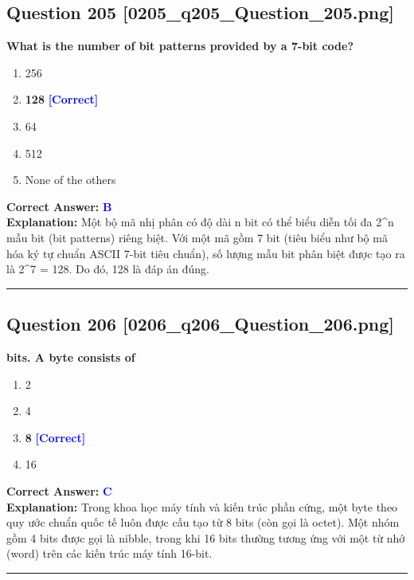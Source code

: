 \documentclass[11pt,a4paper]{article}
\begin{document}
\begin{minipage}{\textwidth}
\subsection*{Question 205 \quad \footnotesize{[0205\_q205\_Question\_205.png]}}
\noindent \textbf{What is the number of bit patterns provided by a 7-bit code?}

\begin{enumerate}[label=\Alph*.]
    \item 256
    \item \textbf{128} \hfill \textcolor{blue}{\textbf{[Correct]}}
    \item 64
    \item 512
    \item None of the others
\end{enumerate}

\noindent \textbf{Correct Answer:} \textcolor{blue}{\textbf{B}} \\[2pt]
\noindent \textbf{Explanation:} Một bộ mã nhị phân có độ dài n bit có thể biểu diễn tối đa 2\textasciicircum{}n mẫu bit (bit patterns) riêng biệt. Với một mã gồm 7 bit (tiêu biểu như bộ mã hóa ký tự chuẩn ASCII 7-bit tiêu chuẩn), số lượng mẫu bit phân biệt được tạo ra là 2\textasciicircum{}7 = 128. Do đó, 128 là đáp án đúng.

\par\vspace{0.3cm}
\hrule
\vspace{0.3cm}
\end{minipage}

\begin{minipage}{\textwidth}
\subsection*{Question 206 \quad \footnotesize{[0206\_q206\_Question\_206.png]}}
\noindent \textbf{bits. A byte consists of}

\begin{enumerate}[label=\Alph*.]
    \item 2
    \item 4
    \item \textbf{8} \hfill \textcolor{blue}{\textbf{[Correct]}}
    \item 16
\end{enumerate}

\noindent \textbf{Correct Answer:} \textcolor{blue}{\textbf{C}} \\[2pt]
\noindent \textbf{Explanation:} Trong khoa học máy tính và kiến trúc phần cứng, một byte theo quy ước chuẩn quốc tế luôn được cấu tạo từ 8 bits (còn gọi là octet). Một nhóm gồm 4 bits được gọi là nibble, trong khi 16 bits thường tương ứng với một từ nhớ (word) trên các kiến trúc máy tính 16-bit.

\par\vspace{0.3cm}
\hrule
\vspace{0.3cm}
\end{minipage}
\end{document}
